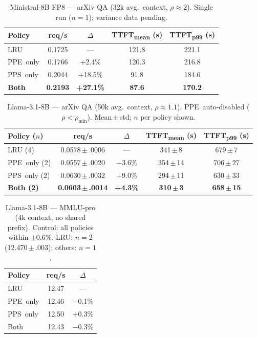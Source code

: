 \documentclass[journal]{IEEEtran}
\newcommand{\ppe}{\textsc{PPE}}
\newcommand{\pps}{\textsc{PPS}}
\newcommand{\rhomin}{\rho_{\min}}
\begin{document}
\begin{table}[t]
\centering
\caption{Ministral-8B FP8 — arXiv QA (32k avg.\ context, $\rho\approx2$).
Single run ($n=1$); variance data pending.}
\label{tab:ministral}
\renewcommand{\arraystretch}{1.2}
\begin{tabular}{@{}lcccc@{}}
\toprule
\textbf{Policy} & \textbf{req/s} & \textbf{$\Delta$} &
\textbf{TTFT\textsubscript{mean} (s)} & \textbf{TTFT\textsubscript{p99} (s)} \\
\midrule
LRU            & 0.1725 & ---     & 121.8 & 221.1 \\
\ppe\ only     & 0.1766 & +2.4\%  & 120.3 & 216.8 \\
\pps\ only     & 0.2044 & +18.5\% &  91.8 & 184.6 \\
\textbf{Both}  & \textbf{0.2193} & \textbf{+27.1\%} &
                 \textbf{87.6}  & \textbf{170.2} \\
\bottomrule
\end{tabular}
\end{table}

\begin{table}[t]
\centering
\caption{Llama-3.1-8B — arXiv QA (50k avg.\ context, $\rho\approx1.1$).
\ppe\ auto-disabled ($\rho<\rhomin$). Mean\,$\pm$\,std; $n$ per policy shown.}
\label{tab:llama}
\renewcommand{\arraystretch}{1.2}
\begin{tabular}{@{}lcccc@{}}
\toprule
\textbf{Policy ($n$)} & \textbf{req/s} & \textbf{$\Delta$} &
\textbf{TTFT\textsubscript{mean} (s)} & \textbf{TTFT\textsubscript{p99} (s)} \\
\midrule
LRU (4)        & 0.0578\,$\pm$\,.0006 & ---      & 341\,$\pm$\,8  & 679\,$\pm$\,7  \\
\ppe\ only (2) & 0.0557\,$\pm$\,.0020 & $-$3.6\% & 354\,$\pm$\,14 & 706\,$\pm$\,27 \\
\pps\ only (2) & 0.0630\,$\pm$\,.0032 & +9.0\%   & 294\,$\pm$\,11 & 630\,$\pm$\,33 \\
\textbf{Both (2)} & \textbf{0.0603\,$\pm$\,.0014} & \textbf{+4.3\%} &
                   \textbf{310\,$\pm$\,3} & \textbf{658\,$\pm$\,15} \\
\bottomrule
\end{tabular}
\end{table}

\begin{table}[t]
\centering
\caption{Llama-3.1-8B — MMLU-pro (4k context, no shared prefix).
Control: all policies within $\pm0.6\%$. LRU: $n=2$ (12.470\,$\pm$\,.003);
others: $n=1$.}
\label{tab:mmlu}
\renewcommand{\arraystretch}{1.2}
\begin{tabular}{@{}lcc@{}}
\toprule
\textbf{Policy} & \textbf{req/s} & \textbf{$\Delta$} \\
\midrule
LRU            & 12.47 & ---      \\
\ppe\ only     & 12.46 & $-$0.1\% \\
\pps\ only     & 12.50 & +0.3\%   \\
Both           & 12.43 & $-$0.3\% \\
\bottomrule
\end{tabular}
\end{table}
\end{document}
